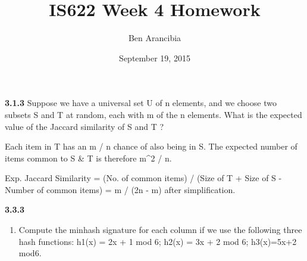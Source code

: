 \documentclass[]{article}
\title{IS622 Week 4 Homework}
\author{Ben Arancibia}
\date{September 19, 2015}
\begin{document}
\maketitle


\textbf{3.1.3} Suppose we have a universal set U of n elements, and we
choose two subsets S and T at random, each with m of the n elements.
What is the expected value of the Jaccard similarity of S and T ?

Each item in T has an m / n chance of also being in S. The expected
number of items common to S \& T is therefore m\^{}2 / n.

Exp. Jaccard Similarity = (No. of common items) / (Size of T + Size of S
- Number of common items) = m / (2n - m) after simplification.

\textbf{3.3.3}

\begin{enumerate}
\def\labelenumi{(\alph{enumi})}
\itemsep1pt\parskip0pt
\item
  Compute the minhash signature for each column if we use the following
  three hash functions: h1(x) = 2x + 1 mod 6; h2(x) = 3x + 2 mod 6;
  h3(x)=5x+2 mod6.
\end{enumerate}
\end{document}
